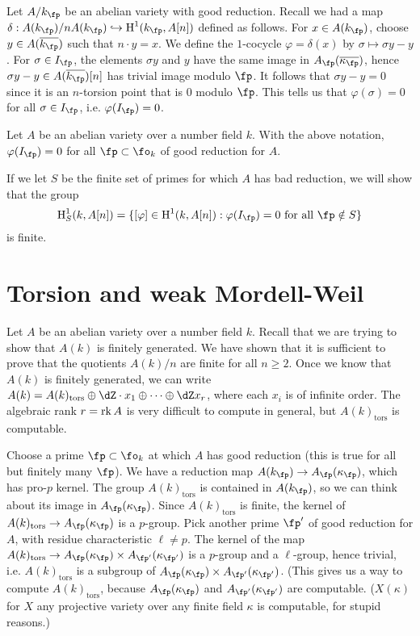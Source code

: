 \documentclass{article}
\begin{document}
Let $A/k_\fp$ be an abelian variety with good reduction. Recall we had a map 
$\delta:A(k_\fp)/n A(k_\fp) \hookrightarrow \h^1(k_\fp,A[n])$ defined as 
follows. For $x\in A(k_\fp)$, choose $y\in A(\overline{k_\fp})$ such that 
$n\cdot y=x$. We define the $1$-cocycle $\varphi=\delta(x)$ by 
$\sigma\mapsto \sigma y - y$. For $\sigma\in I_\fp$, the elements 
$\sigma y$ and $y$ have the same image in $A_\fp(\overline{\kappa_\fp})$, hence  
$\sigma y - y\in A(\overline{k_\fp})[n]$ has trivial image modulo $\fp$. It 
follows that $\sigma y-y=0$ since it is an $n$-torsion point that is $0$ 
modulo $\fp$. This tells us that $\varphi(\sigma) = 0$ for all 
$\sigma\in I_\fp$, i.e. $\varphi(I_\fp) = 0$. 

\begin{lemma}
Let $A$ be an abelian variety over a number field $k$. With the above notation, 
$\varphi(I_\fp) = 0$ for all $\fp\subset \fo_k$ of good reduction for $A$. 
\end{lemma}

If we let $S$ be the finite set of primes for which $A$ has bad reduction, we 
will show that the group
\[
  \h_S^1(k,A[n]) = \{[\varphi]\in \h^1(k,A[n]) : \varphi(I_\fp) = 0\text{ for all } \fp\notin S\}
\]
is finite. 










\section{Torsion and weak Mordell-Weil}

Let $A$ be an abelian variety over a number field $k$. Recall that we are 
trying to show that $A(k)$ is finitely generated. We have shown that it is 
sufficient to prove that the quotients $A(k)/n$ are finite for all 
$n\geqslant 2$. Once we know that $A(k)$ is finitely generated, we can write 
$A(k)=A(k)_\text{tors}\oplus \dZ\cdot x_1\oplus \cdots \oplus \dZ x_r$, where 
each $x_i$ is of infinite order. The algebraic rank $r=\operatorname{rk} A$ is 
very difficult to compute in general, but $A(k)_\text{tors}$ is computable. 

Choose a prime $\fp\subset \fo_k$ at which $A$ has good reduction (this is true 
for all but finitely many $\fp$). We have a reduction map 
$A(k_\fp)\to A_\fp(\kappa_\fp)$, which has pro-$p$ kernel. The group 
$A(k)_\text{tors}$ is contained in $A(k_\fp)$, so we can think about its image 
in $A_\fp(\kappa_\fp)$. Since $A(k)_\text{tors}$ is finite, the kernel of 
$A(k)_\text{tors}\to A_\fp(\kappa_\fp)$ is a $p$-group. Pick another prime 
$\fp'$ of good reduction for $A$, with residue characteristic $\ell\ne p$. The 
kernel of the map 
$A(k)_\text{tors}\to A_\fp(\kappa_\fp)\times A_{\fp'}(\kappa_{\fp'})$ is a 
$p$-group and a $\ell$-group, hence trivial, i.e. $A(k)_\text{tors}$ is a 
subgroup of $A_\fp(\kappa_\fp)\times A_{\fp'}(\kappa_{\fp'})$. (This gives us a 
way to compute $A(k)_\text{tors}$, because $A_\fp(\kappa_\fp)$ and 
$A_{\fp'}(\kappa_{\fp'})$ are computable. ($X(\kappa)$ for $X$ any projective 
variety over any finite field $\kappa$ is computable, for stupid reasons.)
\end{document}
